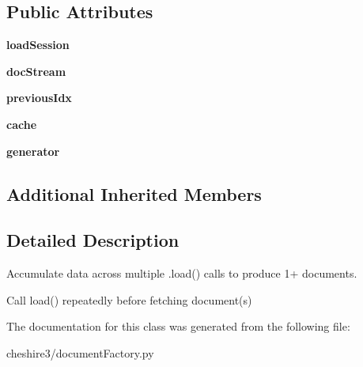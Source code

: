 \subsection*{Public Attributes}
\begin{DoxyCompactItemize}
\item 
\hypertarget{classcheshire3_1_1document_factory_1_1_accumulating_document_factory_a49e6b89b9d903127bbf7310bea26e700}{{\bfseries load\-Session}}\label{classcheshire3_1_1document_factory_1_1_accumulating_document_factory_a49e6b89b9d903127bbf7310bea26e700}

\item 
\hypertarget{classcheshire3_1_1document_factory_1_1_accumulating_document_factory_a30b4c971f8b8a88d2fea951c350fb318}{{\bfseries doc\-Stream}}\label{classcheshire3_1_1document_factory_1_1_accumulating_document_factory_a30b4c971f8b8a88d2fea951c350fb318}

\item 
\hypertarget{classcheshire3_1_1document_factory_1_1_accumulating_document_factory_adc6ca8bc0ab51308e4d22c925400b6cc}{{\bfseries previous\-Idx}}\label{classcheshire3_1_1document_factory_1_1_accumulating_document_factory_adc6ca8bc0ab51308e4d22c925400b6cc}

\item 
\hypertarget{classcheshire3_1_1document_factory_1_1_accumulating_document_factory_a04dee4f61df26f2b0381c8007bb4870e}{{\bfseries cache}}\label{classcheshire3_1_1document_factory_1_1_accumulating_document_factory_a04dee4f61df26f2b0381c8007bb4870e}

\item 
\hypertarget{classcheshire3_1_1document_factory_1_1_accumulating_document_factory_a17e86c3b15924f2213879d23b2cae715}{{\bfseries generator}}\label{classcheshire3_1_1document_factory_1_1_accumulating_document_factory_a17e86c3b15924f2213879d23b2cae715}

\end{DoxyCompactItemize}
\subsection*{Additional Inherited Members}


\subsection{Detailed Description}
\begin{DoxyVerb}Accumulate data across multiple .load() calls to produce 1+  documents.

Call load() repeatedly before fetching document(s)
\end{DoxyVerb}
 

The documentation for this class was generated from the following file\-:\begin{DoxyCompactItemize}
\item 
cheshire3/document\-Factory.\-py\end{DoxyCompactItemize}
